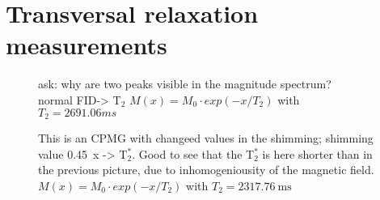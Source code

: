 \section{Transversal relaxation measurements}

\begin{figure}[H]
    \centering
    
    \caption[]{ask: why are two peaks visible in the magnitude spectrum?\\
    normal FID-> T$_2$\newline
     $M(x)=M_0 \cdot exp(-x/T_2)$ with $T_2=\si{2691.06}{ms}$}
    \label{fig:T2}
\end{figure}

\begin{figure}[H]
    \centering
    
    \caption[]{This is an CPMG with changeed values in the shimming; shimming value \SI{0.45}{x} -> T$_2^*$.\newline
    Good to see that the T$_2^*$ is here shorter than in the previous picture, due to inhomogeniousity of the magnetic field.\\
    $M(x)=M_0 \cdot exp(-x/T_2)$ with $T_2=\SI{2317.76}{\milli \second}$}
    \label{fig:CPMG}
\end{figure}
